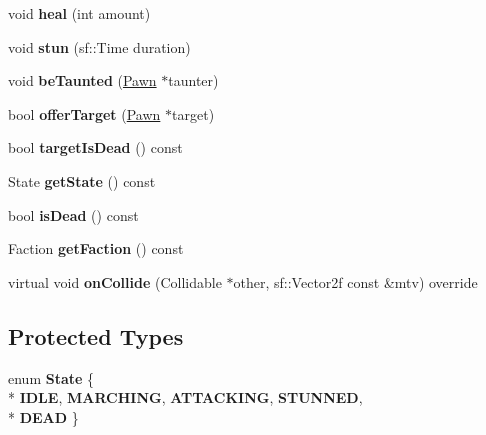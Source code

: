 \begin{DoxyCompactItemize}
\item 
\hypertarget{class_pawn_a26a6eaa626a163283ed66093e17723d6}{}void {\bfseries heal} (int amount)\label{class_pawn_a26a6eaa626a163283ed66093e17723d6}

\item 
\hypertarget{class_pawn_a197ec1bbce0624316ff8fe0ec49b3d6e}{}void {\bfseries stun} (sf\+::\+Time duration)\label{class_pawn_a197ec1bbce0624316ff8fe0ec49b3d6e}

\item 
\hypertarget{class_pawn_a52ef95ca2a7c516325df5546e8131d08}{}void {\bfseries be\+Taunted} (\hyperlink{class_pawn}{Pawn} $\ast$taunter)\label{class_pawn_a52ef95ca2a7c516325df5546e8131d08}

\item 
\hypertarget{class_pawn_aed61c1cf26754757cd4c5cb12421476b}{}bool {\bfseries offer\+Target} (\hyperlink{class_pawn}{Pawn} $\ast$target)\label{class_pawn_aed61c1cf26754757cd4c5cb12421476b}

\item 
\hypertarget{class_pawn_a4c5bda155d7b73b8fe1f63d9aad423dc}{}bool {\bfseries target\+Is\+Dead} () const \label{class_pawn_a4c5bda155d7b73b8fe1f63d9aad423dc}

\item 
\hypertarget{class_pawn_a15e50004263b9935f2cd3377c6d4f8a8}{}State {\bfseries get\+State} () const \label{class_pawn_a15e50004263b9935f2cd3377c6d4f8a8}

\item 
\hypertarget{class_pawn_a9b6dd19cb4c82719d6a9fcc2d9bbee8b}{}bool {\bfseries is\+Dead} () const \label{class_pawn_a9b6dd19cb4c82719d6a9fcc2d9bbee8b}

\item 
\hypertarget{class_pawn_a574b90f999b689bb42555791b86dc6c8}{}Faction {\bfseries get\+Faction} () const \label{class_pawn_a574b90f999b689bb42555791b86dc6c8}

\item 
\hypertarget{class_pawn_a166813524eb441632550e72d77c2c5a9}{}virtual void {\bfseries on\+Collide} (Collidable $\ast$other, sf\+::\+Vector2f const \&mtv) override\label{class_pawn_a166813524eb441632550e72d77c2c5a9}

\end{DoxyCompactItemize}
\subsection*{Protected Types}
\begin{DoxyCompactItemize}
\item 
\hypertarget{class_pawn_af8c8816fa179d6aed5aeb1d14514675c}{}enum {\bfseries State} \{ \\*
{\bfseries I\+D\+L\+E}, 
{\bfseries M\+A\+R\+C\+H\+I\+N\+G}, 
{\bfseries A\+T\+T\+A\+C\+K\+I\+N\+G}, 
{\bfseries S\+T\+U\+N\+N\+E\+D}, 
\\*
{\bfseries D\+E\+A\+D}
 \}\label{class_pawn_af8c8816fa179d6aed5aeb1d14514675c}

\end{DoxyCompactItemize}
